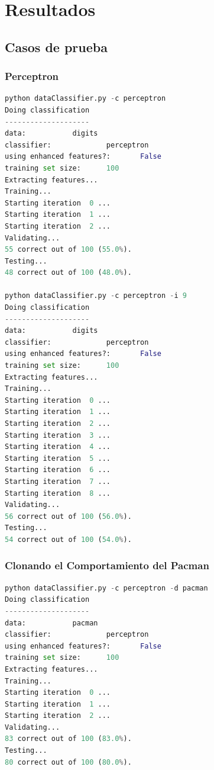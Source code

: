 \documentclass{report}
\begin{document}
  \chapter{Resultados}
    \section{Casos de prueba}
      \subsection{Perceptron}
        \begin{lstlisting}[language=Python, caption=Ejecución del perceptron]
python dataClassifier.py -c perceptron
Doing classification
--------------------
data:           digits
classifier:             perceptron
using enhanced features?:       False
training set size:      100
Extracting features...
Training...
Starting iteration  0 ...
Starting iteration  1 ...
Starting iteration  2 ...
Validating...
55 correct out of 100 (55.0%).
Testing...
48 correct out of 100 (48.0%).

python dataClassifier.py -c perceptron -i 9  
Doing classification
--------------------
data:           digits
classifier:             perceptron
using enhanced features?:       False
training set size:      100
Extracting features...
Training...
Starting iteration  0 ...
Starting iteration  1 ...
Starting iteration  2 ...
Starting iteration  3 ...
Starting iteration  4 ...
Starting iteration  5 ...
Starting iteration  6 ...
Starting iteration  7 ...
Starting iteration  8 ...
Validating...
56 correct out of 100 (56.0%).
Testing...
54 correct out of 100 (54.0%).
        \end{lstlisting}
      \subsection{Clonando el Comportamiento del Pacman}
        \begin{lstlisting}[language=Python, caption=Ejecución del clonador de comportamiento del pacman]
python dataClassifier.py -c perceptron -d pacman
Doing classification
--------------------
data:           pacman
classifier:             perceptron
using enhanced features?:       False
training set size:      100
Extracting features...
Training...
Starting iteration  0 ...
Starting iteration  1 ...
Starting iteration  2 ...
Validating...
83 correct out of 100 (83.0%).
Testing...
80 correct out of 100 (80.0%).
        \end{lstlisting}
\end{document}
